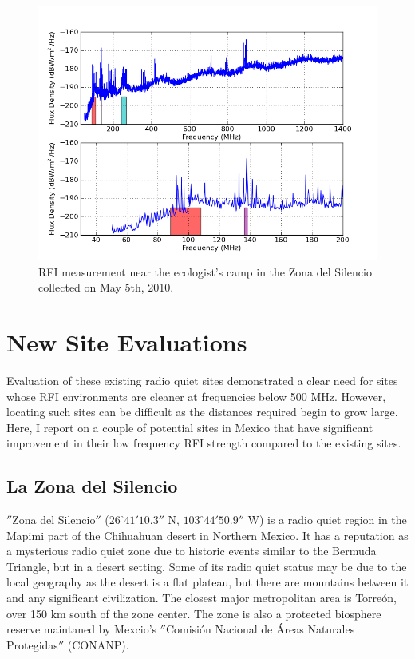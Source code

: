 \begin{figure}[htb]
\begin{center}
\includegraphics[width=0.9\linewidth]{RFI_testing/figures/ZdS_halfway_in_bands.png}
\caption{RFI measurement near the ecologist's camp in the Zona del Silencio collected on May 5th, 2010.}
\label{Fig:zdsendrfi}
\end{center}
\end{figure}

\section{New Site Evaluations}

Evaluation of these existing radio quiet sites demonstrated a clear need for sites whose RFI environments are cleaner at frequencies below 500 MHz. However, locating such sites can be difficult as the distances required begin to grow large. Here, I report on a couple of potential sites in Mexico that have significant improvement in their low frequency RFI strength compared to the existing sites. 

\subsection{La Zona del Silencio}
$''$Zona del Silencio$''$ ($26^\circ 41' 10.3''$ N, $103^\circ 44' 50.9''$ W) is a radio quiet region in the Mapimi part of the Chihuahuan desert in Northern Mexico. It has a reputation as a mysterious radio quiet zone due to historic events similar to the Bermuda Triangle, but in a desert setting. Some of its radio quiet status may be due to the local geography as the desert is a flat plateau, but there are mountains between it and any significant civilization. The closest major metropolitan area is Torre\'{o}n, over 150 km south of the zone center. The zone is also a protected biosphere reserve maintaned by Mexcio's $''$Comisi\'{o}n Nacional de \'{A}reas Naturales Protegidas$''$ (CONANP). 

